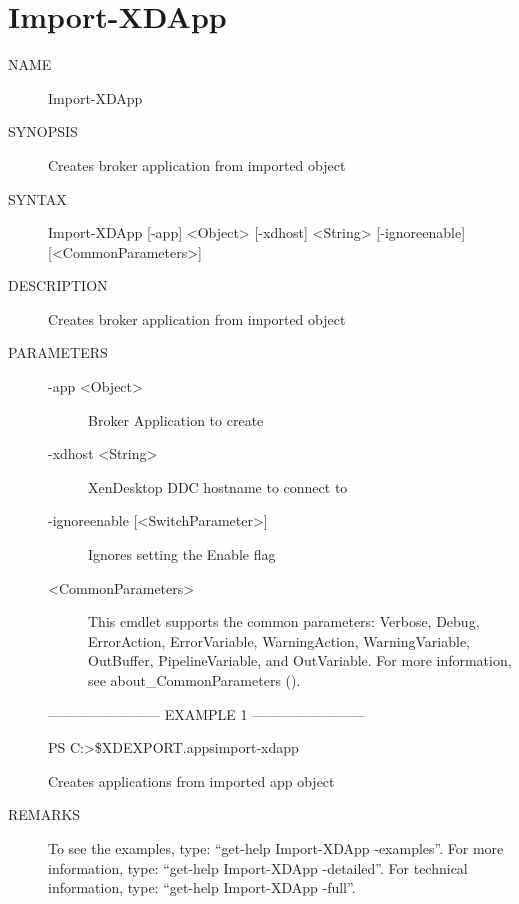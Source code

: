 \documentclass[letterpaper,10pt,english]{sphinxmanual}
\begin{document}
\section{Import-XDApp}
\label{\detokenize{cmd_import:import-xdapp}}\begin{description}
\item[{NAME}] \leavevmode
Import-XDApp

\item[{SYNOPSIS}] \leavevmode
Creates broker application from imported object

\item[{SYNTAX}] \leavevmode
Import-XDApp {[}-app{]} \textless{}Object\textgreater{} {[}-xdhost{]} \textless{}String\textgreater{} {[}-ignoreenable{]} {[}\textless{}CommonParameters\textgreater{}{]}

\item[{DESCRIPTION}] \leavevmode
Creates broker application from imported object

\item[{PARAMETERS}] \leavevmode\begin{description}
\item[{-app \textless{}Object\textgreater{}}] \leavevmode
Broker Application to create

\item[{-xdhost \textless{}String\textgreater{}}] \leavevmode
XenDesktop DDC hostname to connect to

\item[{-ignoreenable {[}\textless{}SwitchParameter\textgreater{}{]}}] \leavevmode
Ignores setting the Enable flag

\item[{\textless{}CommonParameters\textgreater{}}] \leavevmode
This cmdlet supports the common parameters: Verbose, Debug,
ErrorAction, ErrorVariable, WarningAction, WarningVariable,
OutBuffer, PipelineVariable, and OutVariable. For more information, see
about\_CommonParameters ().

\end{description}

————————\textendash{} EXAMPLE 1 ————————\textendash{}

PS C:\textgreater{}\$XDEXPORT.apps\textbar{}import-xdapp

Creates applications from imported app object

\item[{REMARKS}] \leavevmode
To see the examples, type: “get-help Import-XDApp -examples”.
For more information, type: “get-help Import-XDApp -detailed”.
For technical information, type: “get-help Import-XDApp -full”.

\end{description}
\end{document}
